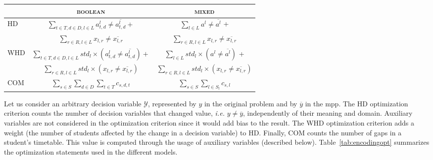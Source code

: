 \documentclass[twocolumn,natbib]{svjour3}          %
\begin{document}
\begin{table*}[t]
	\renewcommand{\arraystretch}{1.5}
	\centering
	\caption{Minimization criterion for the \textsc{Boolean} and \textsc{mixed} models.}
	\label{tab:encodingopt}
		\begin{tabular}{|l|c|c|}
			\hline
			& \textsc{boolean}                                                                                                                                                                                                                    & \textsc{mixed} \\ \hline
			\multirow{2}{*}{HD} & $\sum_{t \in T, d \in D, l \in L} a^l_{t,d} \neq \overline{a^l_{t,d}}+$  & $\sum_{l \in L} a^l \neq \overline{a^l}$ + \\
			& $\sum_{r \in R, l \in L} x_{l,r} \neq \overline{x_{l,r}}$  & $\sum_{r \in R, l \in L} x_{l,r} \neq \overline{x_{l,r}}$ \\\hline
			\multirow{2}{*}{WHD} & $\sum_{t \in T, d \in D, l \in L} std_l \times (a^l_{t,d} \neq \overline{a^l_{t,d}})+$ & $\sum_{l \in L} std_l \times (a^l \neq \overline{a^l})$ + \\
			& $\sum_{r \in R, l \in L} std_l \times (x_{l,r} \neq \overline{x_{l,r}})$  & $\sum_{r \in R, l \in L} std_l \times (x_{l,r} \neq \overline{x_{l,r}})$ \\\hline
			COM & $\sum_{s \in S}\sum_{d \in D}\sum_{t \in T} c_{s,d,t}$ & $\sum_{s \in S}\sum_{l \in S_l} c_{s,l}$\\\hline
	\end{tabular}%
\end{table*}


Let us consider an arbitrary decision variable $\mathcal{Y}$, represented by $y$ in the original problem and by $\overline{y}$ in the \gls{mpp}. The HD optimization criterion counts the number of decision variables that changed value, \emph{i.e.} $y  \neq \overline{y}$, independently of their meaning and domain. Auxiliary variables are not considered in the optimization criterion since it would add bias to the result. The WHD optimization criterion adds a weight (the number of students affected by the change in a decision variable) to HD.  Finally, COM counts the number of gaps in a student's timetable. This value is computed through the usage of auxiliary variables (described below).  Table~\ref{tab:encodingopt} summarizes the optimization statements used in the different models.
\end{document}
